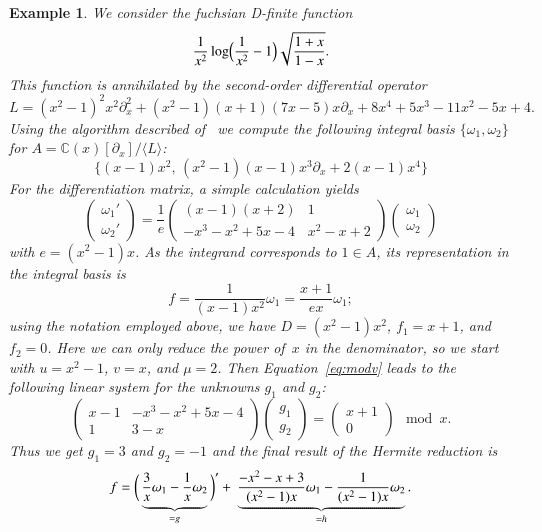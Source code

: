 \documentclass[final,1p,times,authoryear]{elsarticle}
\newtheorem{example}[theorem]{Example}
\def\<#1>{\langle#1\rangle}
\newcommand{\bC}{ {\mathbb C}}
\begin{document}
\begin{example}\label{ex:hr}
We consider the fuchsian D-finite function
\[
  \frac{1}{x^2} \log\Bigl(\frac{1}{x^2}-1\Bigr)\sqrt{\frac{1+x}{1-x}}.
\]
This function is annihilated by the second-order differential operator
\[
  L = (x^2-1)^2 x^2 \partial_x^2 + (x^2-1) (x+1) (7x-5) x \partial_x +
    8x^4+5x^3-11x^2-5x+4.
\]
Using the algorithm described of~\cite{kauers15b} we compute the following
integral basis $\{\omega_1,\omega_2\}$ for $A=\bC(x)[\partial_x]/\<L>$:
\[
  \bigl\{ (x-1) x^2,\, (x^2-1) (x-1) x^3 \partial_x + 2(x-1) x^4 \bigr\}
\]
For the differentiation matrix, a simple calculation yields
\begin{equation}\label{eq:dmat}
  \begin{pmatrix} \omega_1' \\[2pt] \omega_2' \end{pmatrix} =
  \frac{1}{e} \begin{pmatrix} (x-1) (x+2) & 1 \\[2pt] -x^3-x^2+5x-4 & x^2-x+2 \end{pmatrix}
  \begin{pmatrix} \omega_1 \\[2pt] \omega_2 \end{pmatrix}
\end{equation}
with $e=(x^2-1)x$. As the integrand corresponds to $1\in A$, its
representation in the integral basis is
\[
  f = \frac{1}{(x-1)x^2} \omega_1 = \frac{x+1}{ex} \omega_1;
\]
using the notation employed above, we have $D=(x^2-1)x^2$, $f_1=x+1$,
and $f_2=0$. Here we can only reduce the power of~$x$ in the denominator, so
we start with $u=x^2-1$, $v=x$, and $\mu=2$. Then Equation~\eqref{eq:modv} leads
to the following linear system for the unknowns $g_1$ and $g_2$:
\[
  \begin{pmatrix} x-1 & -x^3-x^2+5 x-4 \\ 1 & 3-x \end{pmatrix}
  \begin{pmatrix} g_1 \\ g_2 \end{pmatrix} =
  \begin{pmatrix} x+1 \\ 0 \end{pmatrix} \mod x.
\]
Thus we get $g_1=3$ and $g_2=-1$ and the final result of the Hermite reduction is
\[
f=
  \biggl(\, \underbrace{\vphantom{\frac{1}{(x)}}  \frac{3}{x} \omega_1 - \frac{1}{x} \omega_2}_{=g} \,\biggr)' +\>
  \underbrace{\frac{-x^2-x+3}{(x^2-1)x} \omega_1 - \frac{1}{(x^2-1)x} \omega_2}_{=h}.
\]
\end{example}
\end{document}
